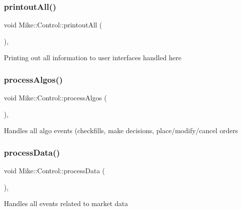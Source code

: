 \subsubsection{\texorpdfstring{printout\+All()}{printoutAll()}}
{\footnotesize\ttfamily void Mike\+::\+Control\+::printout\+All (\begin{DoxyParamCaption}{ }\end{DoxyParamCaption})\hspace{0.3cm}{\ttfamily [inline]}, {\ttfamily [private]}}

Printing out all information to user interfaces handled here \mbox{\label{class_mike_1_1_control_acf3d41cb5dd54a2ee31cfb0709a79e7e}} 
\subsubsection{\texorpdfstring{process\+Algos()}{processAlgos()}}
{\footnotesize\ttfamily void Mike\+::\+Control\+::process\+Algos (\begin{DoxyParamCaption}{ }\end{DoxyParamCaption})\hspace{0.3cm}{\ttfamily [inline]}, {\ttfamily [private]}}

Handles all algo events (checkfills, make decisions, place/modify/cancel orders \mbox{\label{class_mike_1_1_control_a887652b2503a6e881fcceca36f0a0af9}} 
\subsubsection{\texorpdfstring{process\+Data()}{processData()}}
{\footnotesize\ttfamily void Mike\+::\+Control\+::process\+Data (\begin{DoxyParamCaption}{ }\end{DoxyParamCaption})\hspace{0.3cm}{\ttfamily [inline]}, {\ttfamily [private]}}

Handles all events related to market data \mbox{\label{class_mike_1_1_control_a248ae37034b449f3385b28cd1a79af8a}} 
